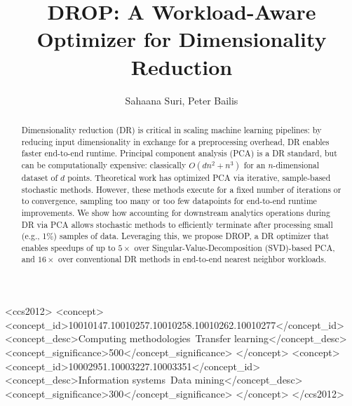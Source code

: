 \documentclass[sigconf,10pt]{acmart}
\newcommand{\red}[1]{{\color{black}#1}}
\theoremstyle{problem}
\begin{document}
\title{DROP: A Workload-Aware Optimizer for Dimensionality Reduction}


\author{Sahaana Suri, Peter Bailis}

\renewcommand{\shortauthors}{S. Suri and P. Bailis}




\begin{abstract}
Dimensionality reduction (DR) is critical in scaling machine learning pipelines: by reducing input dimensionality in exchange for a preprocessing overhead, DR enables faster end-to-end runtime. Principal component analysis (PCA) is a DR standard, but can be computationally expensive: classically $O(dn^2 + n^3)$ for an $n$-dimensional dataset of $d$ points. 
Theoretical work has optimized PCA via iterative, sample-based stochastic methods. 
However, these methods execute for a fixed number of iterations or to convergence, sampling too many or too few datapoints for end-to-end runtime improvements. 
We show how accounting for downstream analytics operations during DR via PCA allows stochastic methods to efficiently terminate after processing small (e.g., 1\%) samples of data. 
Leveraging this, we propose DROP, a DR optimizer that enables speedups of up to \red{$5\times$} over \red{Singular-Value-Decomposition (SVD)-based} PCA, and \red{$16\times$} over conventional DR methods in end-to-end nearest neighbor workloads.
\end{abstract}


\begin{CCSXML}
<ccs2012>
<concept>
<concept_id>10010147.10010257.10010258.10010262.10010277</concept_id>
<concept_desc>Computing methodologies~Transfer learning</concept_desc>
<concept_significance>500</concept_significance>
</concept>
<concept>
<concept_id>10002951.10003227.10003351</concept_id>
<concept_desc>Information systems~Data mining</concept_desc>
<concept_significance>300</concept_significance>
</concept>
</ccs2012>
\end{CCSXML}

\maketitle
\end{document}
